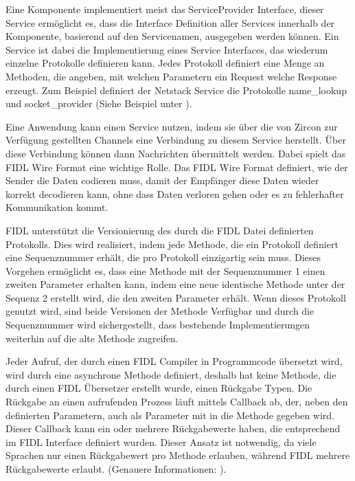 \documentclass[a4paper]{scrartcl}
\begin{document}
Eine Komponente implementiert meist das ServiceProvider Interface, dieser Service ermöglicht es, dass die Interface Definition aller Services innerhalb der Komponente, basierend auf den Servicenamen, ausgegeben werden können. Ein Service ist dabei die Implementierung eines Service Interfaces, das wiederum einzelne Protokolle definieren kann. Jedes Protokoll definiert eine Menge an Methoden, die angeben, mit welchen Parametern ein Request welche Response erzeugt.  Zum Beispiel definiert der Netstack Service die Protokolle name\_lookup und socket\_provider (Siehe Beispiel unter \cite{Fuchsia.Components.Servies}).

Eine Anwendung kann einen Service nutzen, indem sie über die von Zircon zur Verfügung gestellten Channels eine Verbindung zu diesem Service herstellt. Über diese Verbindung können dann Nachrichten übermittelt werden. Dabei spielt das FIDL Wire Format eine wichtige Rolle. Das FIDL Wire Format definiert, wie der Sender die Daten codieren muss, damit der Empfänger diese Daten wieder korrekt decodieren kann, ohne dass Daten verloren gehen oder es zu fehlerhafter Kommunikation kommt.

FIDL unterstützt die Versionierung des durch die FIDL Datei definierten Protokolls. Dies wird realisiert, indem jede Methode, die ein Protokoll definiert eine Sequenznummer erhält, die pro Protokoll einzigartig sein muss. Dieses Vorgehen ermöglicht es, dass eine Methode mit der Sequenznummer 1 einen zweiten Parameter erhalten kann, indem eine neue identische Methode unter der Sequenz 2 erstellt wird, die den zweiten Parameter erhält. Wenn dieses Protokoll genutzt wird, sind beide Versionen der Methode Verfügbar und durch die Sequenznummer wird sichergestellt, dass bestehende Implementierungen weiterhin auf die alte Methode zugreifen. \cite{Fuchsia.FIDL.Tutorial}

Jeder Aufruf, der durch einen FIDL Compiler in Programmcode übersetzt wird, wird durch eine asynchrone Methode definiert, deshalb hat keine Methode, die durch einen FIDL Übersetzer erstellt wurde, einen Rückgabe Typen. Die Rückgabe an einen aufrufenden Prozess läuft mittels Callback ab, der, neben den definierten Parametern, auch als Parameter mit in die Methode gegeben wird. Dieser Callback kann ein oder mehrere Rückgabewerte haben, die entsprechend im FIDL Interface definiert wurden. Dieser Ansatz ist notwendig, da viele Sprachen nur einen Rückgabewert pro Methode erlauben, während FIDL mehrere Rückgabewerte erlaubt. (Genauere Informationen: \cite{Fuchsia.FIDL.Tutorial}).
\end{document}
